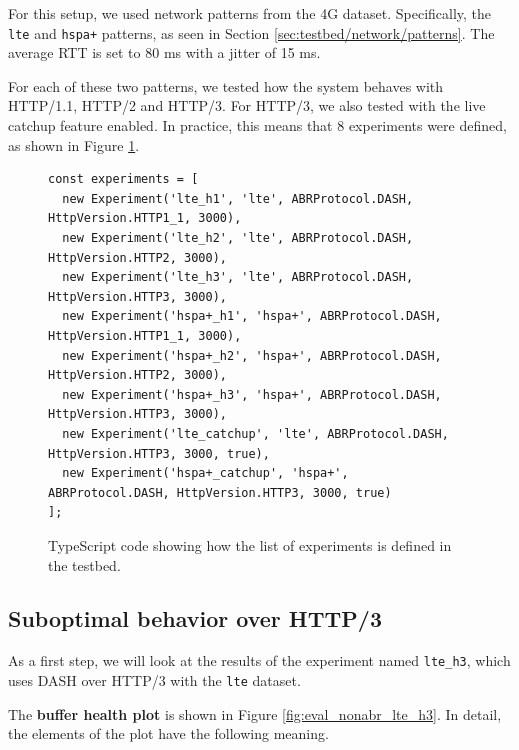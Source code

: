 For this setup, we used network patterns from the 4G dataset. Specifically, the \texttt{lte} and \texttt{hspa+} patterns, as seen in Section \ref{sec:testbed/network/patterns}. The average RTT is set to 80 ms with a jitter of 15 ms.

For each of these two patterns, we tested how the system behaves with HTTP/1.1, HTTP/2 and HTTP/3. For HTTP/3, we also tested with the live catchup feature enabled. In practice, this means that 8 experiments were defined, as shown in Figure \ref{fig:experiments1}.

\begin{figure}[h]
    \centering
    \begin{verbatim}
const experiments = [
  new Experiment('lte_h1', 'lte', ABRProtocol.DASH, HttpVersion.HTTP1_1, 3000),
  new Experiment('lte_h2', 'lte', ABRProtocol.DASH, HttpVersion.HTTP2, 3000),
  new Experiment('lte_h3', 'lte', ABRProtocol.DASH, HttpVersion.HTTP3, 3000),
  new Experiment('hspa+_h1', 'hspa+', ABRProtocol.DASH, HttpVersion.HTTP1_1, 3000),
  new Experiment('hspa+_h2', 'hspa+', ABRProtocol.DASH, HttpVersion.HTTP2, 3000),
  new Experiment('hspa+_h3', 'hspa+', ABRProtocol.DASH, HttpVersion.HTTP3, 3000),
  new Experiment('lte_catchup', 'lte', ABRProtocol.DASH, HttpVersion.HTTP3, 3000, true),
  new Experiment('hspa+_catchup', 'hspa+', ABRProtocol.DASH, HttpVersion.HTTP3, 3000, true)
];
    \end{verbatim}
    \caption{TypeScript code showing how the list of experiments is defined in the testbed.}
    \label{fig:experiments1}
\end{figure}

\subsection{Suboptimal behavior over HTTP/3}
\label{sec:eval/non-abr/h3-behavior}

As a first step, we will look at the results of the experiment named \texttt{lte\_h3}, which uses DASH over HTTP/3 with the \texttt{lte} dataset.

The \textbf{buffer health plot} is shown in Figure \ref{fig:eval_nonabr_lte_h3}. In detail, the elements of the plot have the following meaning.


